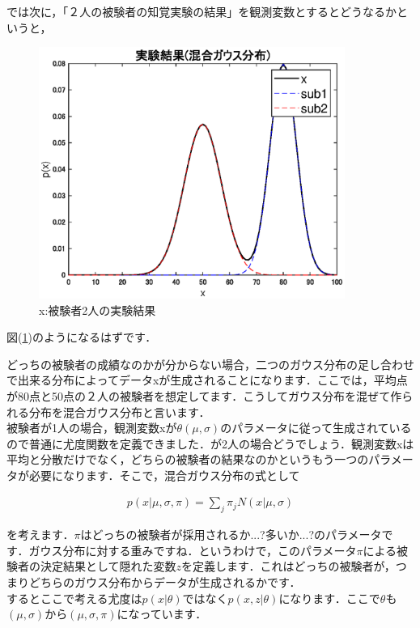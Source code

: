 \documentclass[11pt,a4paper]{ujreport}
\begin{document}
では次に，「２人の被験者の知覚実験の結果」を観測変数とするとどうなるかというと，

\begin{figure}[H]
  \centering
  \label{im:gauss-test2}
  \includegraphics[width=10cm]{../figures/test2.eps}
  \caption{x:被験者2人の実験結果}
\end{figure}

図(\ref{im:gauss-test2})のようになるはずです．

どっちの被験者の成績なのかが分からない場合，二つのガウス分布の足し合わせで出来る分布によってデータxが生成されることになります．ここでは，平均点が80点と50点の２人の被験者を想定してます．こうしてガウス分布を混ぜて作られる分布を混合ガウス分布と言います．\\

被験者が1人の場合，観測変数xが$\theta(\mu,\sigma)$のパラメータに従って生成されているので普通に尤度関数を定義できました．が2人の場合どうでしょう．観測変数xは平均と分散だけでなく，どちらの被験者の結果なのかというもう一つのパラメータが必要になります．そこで，混合ガウス分布の式として

\begin{align}
  p(x|\mu,\sigma,\pi) = \sum_j \pi_j N(x|\mu,\sigma)
\end{align}

を考えます．$\pi$はどっちの被験者が採用されるか...?多いか...?のパラメータです．ガウス分布に対する重みですね．というわけで，このパラメータ$\pi$による被験者の決定結果として隠れた変数$z$を定義します．これはどっちの被験者が，つまりどちらのガウス分布からデータが生成されるかです．\\

するとここで考える尤度は$p(x|\theta)$ではなく$p(x,z|\theta)$になります．ここで$\theta$も$(\mu,\sigma)$から$(\mu, \sigma, \pi)$になっています．\\
\end{document}
